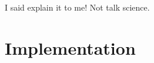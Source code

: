 

\begin{savequote}[50mm]
I said explain it to me! Not talk science.
\end{savequote}


\newcommand{\chaimplpath}{6_implementation}
\newcommand{\codigo}[1]{``\texttt{#1}''}


\chapter{Implementation}
\label{cha:implementation}

\ifpdf
    \graphicspath{{\chaimplpath/figures/PNG/}{\chaimplpath/figures/PDF/}{\chaimplpath/figures/}}
\else
    \graphicspath{{\chaimplpath/figures/EPS/}{\chaimplpath/figures/}}
\fi








% 




